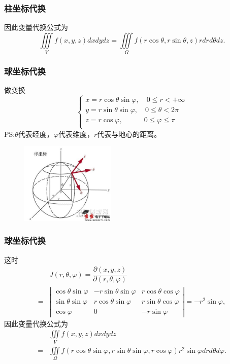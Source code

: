 \documentclass[xetex]{beamer}
\begin{document}
\begin{frame}
    \frametitle{柱坐标代换}
    因此变量代换公式为
    $$\iiint \limits_V f(x,y,z) dxdydz =  \iiint \limits_{\Omega} f(r \cos{\theta} , r \sin{\theta} , z) rdrd \theta dz. $$
\end{frame} 

\begin{frame}
    \frametitle{球坐标代换}
    做变换
    $$\begin{cases}
        x = r \cos{\theta} \sin{\varphi} , \quad 0 \leq r < + \infty \\
        y = r \sin{\theta} \sin{\varphi} , \quad 0 \leq \theta < 2 \pi \\
        z = r \cos{\varphi} , \qquad \quad 0 \leq \varphi \leq \pi \\
    \end{cases}$$
    PS:$\theta$代表经度，$\varphi$代表维度，$r$代表与地心的距离。\\
    \begin{figure}[ht]
        \centering %
       \includegraphics[width=0.4\textwidth]{img/g.jpg}
    \end{figure}
\end{frame} 

\begin{frame}
    \frametitle{球坐标代换}
    这时
    \begin{align*}
         &J(r , \theta , \varphi) = \dfrac {\partial (x,y,z)} {\partial (r, \theta , \varphi)} \\
         =&\left|
         \begin{matrix}
             \cos{\theta} \sin{\varphi} & -r \sin{\theta} \sin{\varphi} & r \cos{\theta} \cos{\varphi} \\
             \sin{\theta} \sin{\varphi} & r \cos{\theta} \sin{\varphi} & r \sin{\theta} \cos{\varphi} \\
             \cos{\varphi} & 0 & -r \sin{\varphi} 
         \end{matrix} \right| = - r^2 \sin{\varphi},
    \end{align*} 
     因此变量代换公式为
    \begin{align*}
        &\iiint \limits_V f(x,y,z) dxdydz \\
        =  &\iiint \limits_{\Omega} f(r \cos{\theta} \sin{\varphi} , r \sin{\theta} \sin{\varphi} , r \cos{\varphi}) r^2        \sin{\varphi} drd \theta d \varphi . 
    \end{align*}
\end{frame} 
\end{document}
